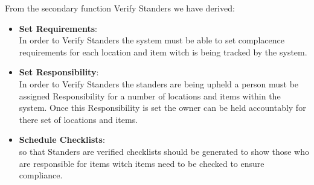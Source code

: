 \documentclass[Letter,11pt]{article}
\begin{document}
		From the secondary function Verify Standers we have derived:
		\begin{itemize}
			\item \textbf{Set Requirements}:\\
			In order to Verify Standers the system must be able to set complacence requirements for each location and item witch is being tracked by the system.
			\item \textbf{Set Responsibility}:\\
			In order to Verify Standers the standers are being upheld a person must be assigned Responsibility for a number of locations and items within the system. Once this Responsibility is set the owner can be held accountably for there set of locations and items. 
			\item \textbf{Schedule Checklists}:\\
			so that Standers are verified  checklists should be generated to show those who are responsible for items witch items need to be checked to ensure compliance.
		\end{itemize}
		
\end{document}
